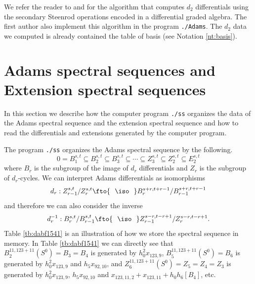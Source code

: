 \documentclass{amsart}
\numberwithin{equation}{section}
\begin{document}
We refer the reader to \cite{Chua} and \cite{Nassau} for the algorithm that computes $d_2$ differentials using the secondary Steenrod operations encoded in a differential graded algebra. The first author also implement this algorithm in the program \verb|./Adams|. The $d_2$ data we computed is already contained the table of basis (see Notation \ref{nt:basis}).

\section{Adams spectral sequences and Extension spectral sequences}\label{sec:diff}
In this section we describe how the computer program \verb|./ss| organizes the data of the Adams spectral sequence and the extension spectral sequence and how to read the differentials and extensions generated by the computer program.

The program \texttt{./ss} organizes the Adams spectral sequence by the following.
$$0=B_1^{s,t}\subseteq B_2^{s,t}\subseteq B_3^{s,t}\subseteq \cdots\subseteq Z_3^{s,t}\subseteq Z_2^{s,t}\subseteq E_2^{s,t}$$
where $B_r$ is the subgroup of the image of $d_r$ differentials and $Z_r$ is the subgroup of $d_r$-cycles. We can interpret Adams differentials as isomorphisms
\begin{equation}\label{eq:dr}
    d_r: Z_{r-1}^{s,t}/Z_r^{s,t}\fto{~~\iso~~} B_r^{s+r,t+r-1}/B_{r-1}^{s+r,t+r-1}
\end{equation}
and therefore we can also consider the inverse
\begin{equation}\label{eq:drinv}
    d_r^{-1}: B_{r}^{s,t}/B_{r-1}^{s,t}\fto{~~\iso~~} Z_{r-1}^{s-r,t-r+1}/Z_r^{s-r,t-r+1}.
\end{equation}
Table \ref{tb:dabf1541} is an illustration of how we store the spectral sequence in memory. In Table \ref{tb:dabf1541} we can directly see that $B_2^{11,123+11}(S^0)=B_3=B_4$ is generated by $h_0^2x_{123,9}$, $B_5^{11,123+11}(S^0)=B_6$ is generated by $h_0^2x_{123,9}$ and $h_5x_{92,10}$, and $Z_6^{11,123+11}(S^0)=Z_5=Z_4=Z_3$ is generated by $h_0^2x_{123,9}$, $h_5x_{92,10}$ and $x_{123,11,2}+x_{123,11}+h_0h_6[B_4]$, etc.
\end{document}

